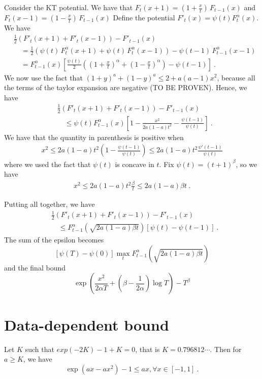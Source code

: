 \documentclass{colt2016_empty} %
\begin{document}
Consider the KT potential. We have that $F_t(x+1)=(1+\frac{x}{t}) \, F_{t-1}(x)$ and $F_t(x-1)=(1-\frac{x}{t}) \, F_{t-1}(x)$
Define the potential $F'_t(x)=\psi(t) F^\alpha_t(x)$.
We have
\begin{align}
&\frac{1}{2}\left(F'_t(x+1)+F'_t(x-1)\right) - F'_{t-1}(x) \\
&\quad = \frac{1}{2} \left(\psi(t) \, F^\alpha_t(x+1)+\psi(t) \, F^\alpha_t(x-1)\right)-\psi(t-1) \, F^\alpha_{t-1}(x-1) \\
&\quad = F^\alpha_{t-1}(x) \left[\frac{\psi(t)}{2} \left(  (1+\frac{x}{t})^\alpha +(1-\frac{x}{t})^\alpha \right) -\psi(t-1) \right]~.
\end{align}
We now use the fact that $(1+y)^a+(1-y)^a \leq 2+a(a-1)x^2$, because all the terms of the taylor expansion are negative (TO BE PROVEN).
Hence, we have
\begin{align}
&\frac{1}{2}\left(F'_t(x+1)+F'_t(x-1)\right) - F'_{t-1}(x) \\
&\quad \leq \psi(t) F^\alpha_{t-1}(x) \left[1-\frac{x^2}{2a(1-a)t^2} -\frac{\psi(t-1)}{\psi(t)} \right]~.
\end{align}
We have that the quantity in parenthesis is positive when
\begin{align}
x^2 \leq 2a(1-a) t^2 (1-\frac{\psi(t-1)}{\psi(t)}) \leq 2a(1-a) t^2 \frac{\psi'(t-1)}{\psi(t)}
\end{align}
where we used the fact that $\psi(t)$ is concave in $t$.
Fix $\psi(t)=(t+1)^\beta$, so we have
\begin{align}
x^2 \leq 2a(1-a) t^2 \frac{\beta }{t} \leq 2a(1-a) \beta t ~.
\end{align}

Putting all together, we have
\begin{align}
&\frac{1}{2}\left(F'_t(x+1)+F'_t(x-1)\right) - F'_{t-1}(x) \\
&\quad \leq F^\alpha_{t-1}(\sqrt{2a(1-a) \beta t}) \left[\psi(t)-\psi(t-1) \right]~.
\end{align}
The sum of the epsilon becomes 
\[
\left[\psi(T)-\psi(0) \right] \max_t F^\alpha_{t-1}(\sqrt{2a(1-a) \beta t}) 
\]
and the final bound
\[
\exp\left( \frac{x^2}{2 \alpha T} +(\beta-\frac{1}{2\alpha})\log T\right) - T^\beta
\]


\section{Data-dependent bound}

\begin{lemma}
Let $K$ such that $exp(-2K)-1+K=0$, that is $K=0.796812\cdots$. Then for $a\geq K$, we have
\[
\exp(a x -a x^2) -1\leq a x, \forall x\in [-1,1]~.
\]
\end{lemma}
\end{document}
